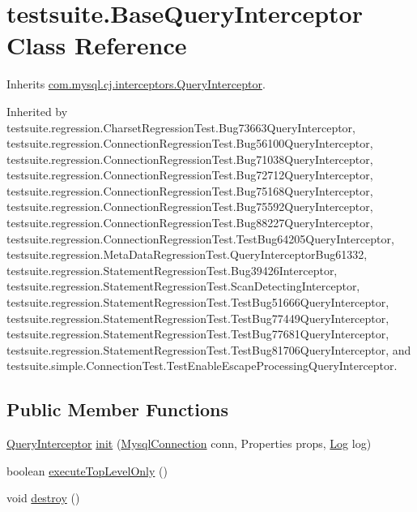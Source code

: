 \hypertarget{classtestsuite_1_1_base_query_interceptor}{}\section{testsuite.\+Base\+Query\+Interceptor Class Reference}
\label{classtestsuite_1_1_base_query_interceptor}


Inherits \mbox{\hyperlink{interfacecom_1_1mysql_1_1cj_1_1interceptors_1_1_query_interceptor}{com.\+mysql.\+cj.\+interceptors.\+Query\+Interceptor}}.



Inherited by testsuite.\+regression.\+Charset\+Regression\+Test.\+Bug73663\+Query\+Interceptor, testsuite.\+regression.\+Connection\+Regression\+Test.\+Bug56100\+Query\+Interceptor, testsuite.\+regression.\+Connection\+Regression\+Test.\+Bug71038\+Query\+Interceptor, testsuite.\+regression.\+Connection\+Regression\+Test.\+Bug72712\+Query\+Interceptor, testsuite.\+regression.\+Connection\+Regression\+Test.\+Bug75168\+Query\+Interceptor, testsuite.\+regression.\+Connection\+Regression\+Test.\+Bug75592\+Query\+Interceptor, testsuite.\+regression.\+Connection\+Regression\+Test.\+Bug88227\+Query\+Interceptor, testsuite.\+regression.\+Connection\+Regression\+Test.\+Test\+Bug64205\+Query\+Interceptor, testsuite.\+regression.\+Meta\+Data\+Regression\+Test.\+Query\+Interceptor\+Bug61332, testsuite.\+regression.\+Statement\+Regression\+Test.\+Bug39426\+Interceptor, testsuite.\+regression.\+Statement\+Regression\+Test.\+Scan\+Detecting\+Interceptor, testsuite.\+regression.\+Statement\+Regression\+Test.\+Test\+Bug51666\+Query\+Interceptor, testsuite.\+regression.\+Statement\+Regression\+Test.\+Test\+Bug77449\+Query\+Interceptor, testsuite.\+regression.\+Statement\+Regression\+Test.\+Test\+Bug77681\+Query\+Interceptor, testsuite.\+regression.\+Statement\+Regression\+Test.\+Test\+Bug81706\+Query\+Interceptor, and testsuite.\+simple.\+Connection\+Test.\+Test\+Enable\+Escape\+Processing\+Query\+Interceptor.

\subsection*{Public Member Functions}
\begin{DoxyCompactItemize}
\item 
\mbox{\hyperlink{interfacecom_1_1mysql_1_1cj_1_1interceptors_1_1_query_interceptor}{Query\+Interceptor}} \mbox{\hyperlink{classtestsuite_1_1_base_query_interceptor_a9772ae8ec3555a8f2d3a49658c90b3c7}{init}} (\mbox{\hyperlink{interfacecom_1_1mysql_1_1cj_1_1_mysql_connection}{Mysql\+Connection}} conn, Properties props, \mbox{\hyperlink{interfacecom_1_1mysql_1_1cj_1_1log_1_1_log}{Log}} log)
\item 
boolean \mbox{\hyperlink{classtestsuite_1_1_base_query_interceptor_ad806e1659dde0537e052f1825ee6a40e}{execute\+Top\+Level\+Only}} ()
\item 
void \mbox{\hyperlink{classtestsuite_1_1_base_query_interceptor_a8f368e0057821e78db66d4282c4d3b8e}{destroy}} ()
\end{DoxyCompactItemize}


